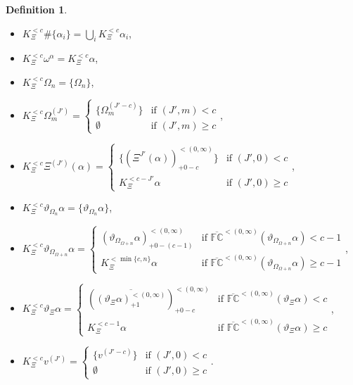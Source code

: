 \documentclass[11pt]{amsart}
\theoremstyle{definition}
\newtheorem{definition}[theorem]{Definition}
\begin{document}
\begin{definition}
  \begin{itemize}
  \item $K^{<c}_\Xi\#\{\alpha_i\}=\bigcup_i K^{<c}_\Xi\alpha_i$,
  \item $K^{<c}_\Xi\omega^\alpha=K^{<c}_\Xi\alpha$,
  \item $K^{<c}_\Xi\Omega_n=\{\Omega_n\}$,
  \item $K^{<c}_\Xi\Omega_m^{(J')}=\left\{\begin{array}{ll}
                                          \{\Omega^{(J'-c)}_m\}&\text{if }(J',m)<c\\
                                          \emptyset&\text{if }(J',m)\geq c
                                        \end{array}\right.$,
  \item $K^{<c}_\Xi\Xi^{(J')}(\alpha)=\left\{\begin{array}{ll}
                                          \{(\Xi^{J'}(\alpha))^{<(0,\infty)}_{+0-c}\}&\text{if }(J',0)<c\\
                                          K^{< c-J'}_\Xi\alpha&\text{if }(J',0)\geq c
                                        \end{array}\right.$,
  \item $K^{<c}_\Xi\vartheta_{\Omega_n}\alpha=\{\vartheta_{\Omega_n}\alpha\}$,
  \item $K^{<c}_\Xi\vartheta_{\Omega_{\Omega+n}}\alpha=
    \left\{\begin{array}{ll}
             (\vartheta_{\Omega_{\Omega+n}}\alpha)^{<(0,\infty)}_{+0-(c-1)}&\text{if }\overline{\mathbb{FC}}^{<(0,\infty)}(\vartheta_{\Omega_{\Omega+n}}\alpha)<c-1\\
             K_\Xi^{<\min\{c,n\}}\alpha&\text{if }\overline{\mathbb{FC}}^{<(0,\infty)}(\vartheta_{\Omega_{\Omega+n}}\alpha)\geq c-1
           \end{array}\right.$,
  \item $K^{<c}_\Xi\vartheta_\Xi\alpha=
    \left\{\begin{array}{ll}
             \left(\overline{(\vartheta_\Xi\alpha)^{<(0,\infty)}_{+1}}\right)^{<(0,\infty)}_{+0-c}&\text{if }\overline{\mathbb{FC}}^{< (0,\infty)}(\vartheta_\Xi\alpha)<c\\
             K_\Xi^{<c-1}\alpha&\text{if }\overline{\mathbb{FC}}^{<(0,\infty)}(\vartheta_\Xi\alpha)\geq c
           \end{array}\right.$,
       \item $K^{<c}_\Xi v^{(J')}=\left\{\begin{array}{ll}\{v^{(J'-c)}\}&\text{if }(J',0)< c\\
                                                         \emptyset&\text{if }(J',0)\geq c\end{array}\right.$.
  \end{itemize}
\end{definition}
\end{document}
